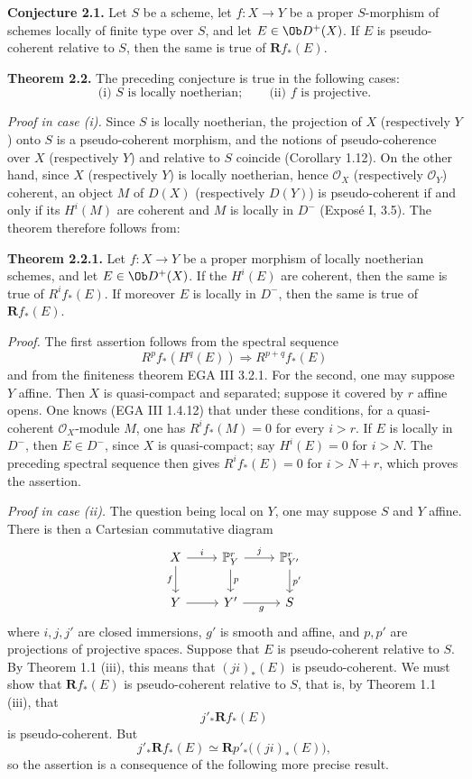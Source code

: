 \textbf{Conjecture 2.1.} Let \(S\) be a scheme, let \(f:X\to Y\) be a proper \(S\)-morphism of schemes locally of finite type over \(S\), and let \(E\in \Ob D^+(X)\). If \(E\) is pseudo-coherent relative to \(S\), then the same is true of \(\mathbf R f_*(E)\).

\textbf{Theorem 2.2.} The preceding conjecture is true in the following cases:
\[
  \text{(i) } S\text{ is locally noetherian};\qquad
  \text{(ii) } f\text{ is projective}.
\]

\emph{Proof in case (i).} Since \(S\) is locally noetherian, the projection of \(X\) (respectively \(Y\)) onto \(S\) is a pseudo-coherent morphism, and the notions of pseudo-coherence over \(X\) (respectively \(Y\)) and relative to \(S\) coincide (Corollary 1.12). On the other hand, since \(X\) (respectively \(Y\)) is locally noetherian, hence \(\mathcal O_X\) (respectively \(\mathcal O_Y\)) coherent, an object \(M\) of \(D(X)\) (respectively \(D(Y)\)) is pseudo-coherent if and only if its \(H^i(M)\) are coherent and \(M\) is locally in \(D^{-}\) (Exposé I, 3.5). The theorem therefore follows from:

\textbf{Theorem 2.2.1.} Let \(f:X\to Y\) be a proper morphism of locally noetherian schemes, and let \(E\in \Ob D^+(X)\). If the \(H^i(E)\) are coherent, then the same is true of \(R^if_*(E)\). If moreover \(E\) is locally in \(D^{-}\), then the same is true of \(\mathbf Rf_*(E)\).

\emph{Proof.} The first assertion follows from the spectral sequence
\[
  R^pf_*(H^q(E)) \Longrightarrow R^{p+q}f_*(E)
\]
and from the finiteness theorem EGA III 3.2.1. For the second, one may suppose \(Y\) affine. Then \(X\) is quasi-compact and separated; suppose it covered by \(r\) affine opens. One knows (EGA III 1.4.12) that under these conditions, for a quasi-coherent \(\mathcal O_X\)-module \(M\), one has \(R^if_*(M)=0\) for every \(i>r\). If \(E\) is locally in \(D^{-}\), then \(E\in D^{-}\), since \(X\) is quasi-compact; say \(H^i(E)=0\) for \(i>N\). The preceding spectral sequence then gives \(R^if_*(E)=0\) for \(i>N+r\), which proves the assertion.

\emph{Proof in case (ii).} The question being local on \(Y\), one may suppose \(S\) and \(Y\) affine. There is then a Cartesian commutative diagram
\[
\begin{tikzcd}
X \arrow[r,"i"] \arrow[d,"f"'] & \mathbb P^r_Y \arrow[d,"p"] \arrow[r,"j"] & \mathbb P^r_{Y'} \arrow[d,"p'"]\\
Y \arrow[r] & Y' \arrow[r,"g"'] & S
\end{tikzcd}
\]
where \(i,j,j'\) are closed immersions, \(g'\) is smooth and affine, and \(p,p'\) are projections of projective spaces. Suppose that \(E\) is pseudo-coherent relative to \(S\). By Theorem 1.1 (iii), this means that \((ji)_*(E)\) is pseudo-coherent. We must show that \(\mathbf Rf_*(E)\) is pseudo-coherent relative to \(S\), that is, by Theorem 1.1 (iii), that
\[
  j'_*\mathbf Rf_*(E)
\]
is pseudo-coherent. But
\[
  j'_*\mathbf Rf_*(E)\simeq \mathbf Rp'_*\bigl((ji)_*(E)\bigr),
\]
so the assertion is a consequence of the following more precise result.


